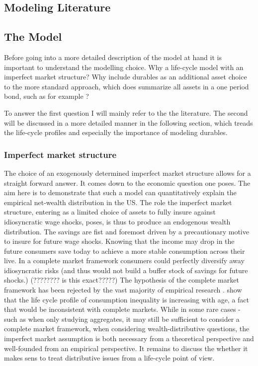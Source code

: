 \documentclass[a4paper,12pt]{article}
\begin{document}
\subsection{Modeling Literature}

\subsection{The Model}
Before going into a more detailed description of the model at hand it is important to understand the modelling choice. Why a life-cycle model with an imperfect market structure? Why include durables as an  additional asset choice to the more standard approach, which does summarize all assets in a one period bond, such as for example \cite{hintermaier2011}? 

To answer the first question I will mainly refer to the the literature. The second will be discussed in a more detailed manner in the following section, which treads the life-cycle profiles and especially the importance of modeling durables. 

\subsubsection{Imperfect market structure}
The choice of an exogenously determined imperfect market structure allows for a straight forward answer. It comes down to the economic question one poses. The aim here is to demonstrate that such a model can quantitatively explain the empirical net-wealth distribution in the US. The role the imperfect market structure, entering as a limited choice of assets to fully insure against idiosyncratic wage shocks, poses, is thus to produce an endogenous wealth distribution. The savings are fist and foremost driven by a precautionary motive to insure for future wage shocks. Knowing that the income may drop in the future consumers save today to achieve a more stable consumption across their live. In a complete market framework consumers could perfectly diversify away idiosyncratic risks \citep{a&w2010}  (and thus would not build a buffer stock of savings for future shocks.) (???????? is this exact?????)
The hypothesis of the complete market framework has been rejected by the vast majority of empirical research \citep{a&w2010}. \cite{deaton1994} show that the life cycle profile of consumption inequality is increasing with age, a fact that would be inconsistent with complete markets. While in some rare cases - such as when only studying aggregates, it may still be sufficient to consider a complete market framework, when considering wealth-distributive questions, the imperfect market assumption is both necessary from a theoretical perspective and well-founded from an empirical perspective. It remains to discuss the whether it makes sens to treat distributive issues from a life-cycle point of view.
\end{document}
